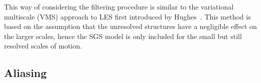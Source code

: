 This way of considering the filtering procedure is similar to the variational multiscale (VMS) 
approach to LES first introduced by Hughes~\cite{Hughes}. This method is based on the assumption that
the unresolved structures have a negligible effect on the larger scales, hence the SGS model is 
only included for the small but still resolved scales of motion.




\subsection{Aliasing}

